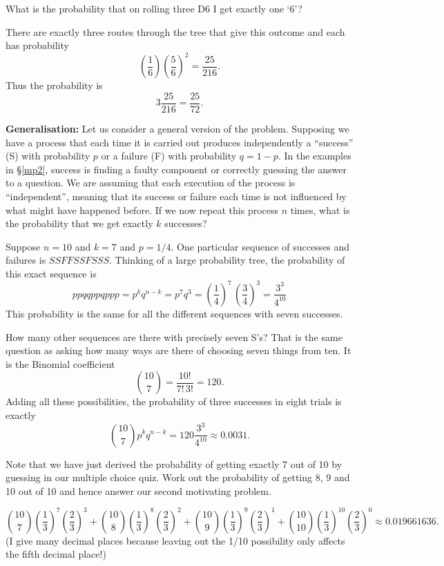 \begin{example}
What is the probability that on rolling three D6 I get exactly one `6'? 

There are exactly three routes through the tree that give this outcome and each has probability 
 \[
      \left( \frac16 \right) \left( \frac56 \right)^2 = \frac{25}{216}.
 \]
Thus the probability is 
 \[
     3 \frac{25}{216} = \frac{25}{72}. 
 \] 
\end{example}
\textbf{Generalisation:} Let us consider a general version of the problem.  Supposing we have a process that each time it is carried out produces independently a ``success'' (S) with probability $p$ or a failure (F) with probability $q=1-p$. In the examples in \S\ref{mp2}, success is finding a faulty component or correctly guessing the answer to a question.  We are assuming that each execution of the process is ``independent'', meaning that its success or failure  each time is not influenced by what might have happened before.  If we now repeat this process $n$ times, what is the probability that we get exactly $k$ successes? 
\begin{example}
Suppose $n=10$ and $k=7$ and $p=1/4$. One particular sequence of successes and failures is $SSFFSSFSSS$. Thinking of a large probability tree, the probability of this exact sequence is 
 \[
    ppqqppqppp = p^k q^{n-k} = p^7 q^3 = \left( \frac14 \right)^7 \, \left( \frac34 \right)^3   = \frac{3^3}{4^{10}}
\]
This probability is the same for all the different sequences with seven successes. 

How many other sequences  are there with precisely seven S's?  That is the same question as asking how many ways are there of choosing seven things from ten.  It is the Binomial coefficient
 \[
       \binom{10}7 = \frac{10!}{7! \,3!} = 120. 
  \]
Adding all these possibilities, the probability of three successes in eight trials is exactly 
  \[
     \binom{10}7 p^k q^{n-k} = 120 \frac{3^3}{4^{10}} \approx 0.0031. 
  \]
\end{example}

\begin{exer}
Note that we have just derived the probability of getting exactly 7 out of 10 by guessing in our multiple choice quiz. Work out the probability of getting 8, 9 and 10 out of 10 and hence answer our second motivating problem. 
\end{exer}

\begin{sol}
\[
    \binom{10}{7} \left( \frac13\right)^7 \left( \frac23 \right)^3 +  
    \binom{10}{8} \left( \frac13\right)^8 \left( \frac23 \right)^2 +  
    \binom{10}{9} \left( \frac13\right)^9 \left( \frac23 \right)^1 +  
    \binom{10}{10} \left( \frac13\right)^{10} \left( \frac23 \right)^0  \approx 0.019661636.
 \]
 (I give many decimal places because leaving out the 1/10 possibility only affects the fifth decimal place!) 
\end{sol}

